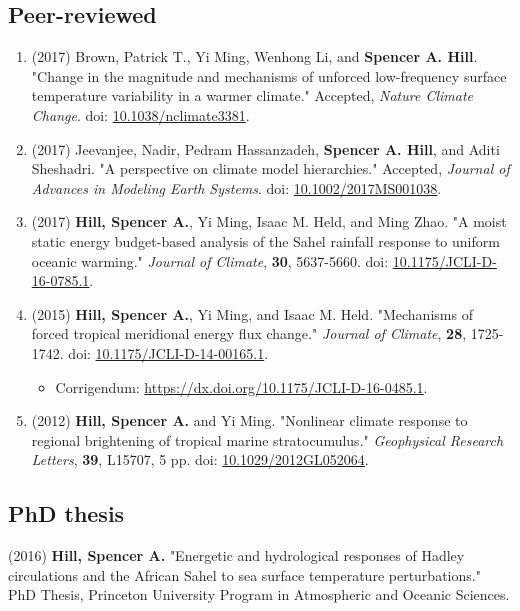 \documentclass[12pt,letterpaper]{shillcv}
\begin{document}
\subsection*{Peer-reviewed}
\label{sec:org4efc4f9}
\begin{enumerate}
\item (2017) Brown, Patrick T., Yi Ming, Wenhong Li, and \textbf{Spencer A. Hill}.  "Change
in the magnitude and mechanisms of unforced low-frequency surface temperature
variability in a warmer climate."  Accepted, \emph{Nature Climate Change}.  doi:
\href{https://doi.org/10.1038/nclimate3381}{10.1038/nclimate3381}.
\item (2017) Jeevanjee, Nadir, Pedram Hassanzadeh, \textbf{Spencer A. Hill}, and Aditi
Sheshadri.  "A perspective on climate model hierarchies."  Accepted, \emph{Journal
of Advances in Modeling Earth Systems}.  doi: \href{https://doi.org/10.1002/2017MS001038}{10.1002/2017MS001038}.
\item (2017) \textbf{Hill, Spencer A.}, Yi Ming, Isaac M. Held, and Ming Zhao.  "A moist
static energy budget-based analysis of the Sahel rainfall response to uniform
oceanic warming."  \emph{Journal of Climate}, \textbf{30}, 5637-5660.  doi:
\href{https://doi.org/10.1175/JCLI-D-16-0785.1}{10.1175/JCLI-D-16-0785.1}.
\item (2015) \textbf{Hill, Spencer A.}, Yi Ming, and Isaac M. Held.  "Mechanisms of forced
tropical meridional energy flux change."  \emph{Journal of Climate}, \textbf{28}, 1725-1742.
doi: \href{http://dx.doi.org/10.1175/JCLI-D-14-00165.1}{10.1175/JCLI-D-14-00165.1}.
\begin{itemize}
\item Corrigendum: \url{https://dx.doi.org/10.1175/JCLI-D-16-0485.1}.
\end{itemize}
\item (2012) \textbf{Hill, Spencer A.} and Yi Ming.  "Nonlinear climate response to regional
brightening of tropical marine stratocumulus."  \emph{Geophysical Research Letters},
\textbf{39}, L15707, 5 pp. doi:
\href{http://dx.doi.org/10.1029/2012GL052064}{10.1029/2012GL052064}.
\end{enumerate}
\subsection*{PhD thesis}
\label{sec:orgcd5fcc6}
(2016) \textbf{Hill, Spencer A.} "Energetic and hydrological responses of Hadley
circulations and the African Sahel to sea surface temperature perturbations."
PhD Thesis, Princeton University Program in Atmospheric and Oceanic Sciences.
\end{document}
